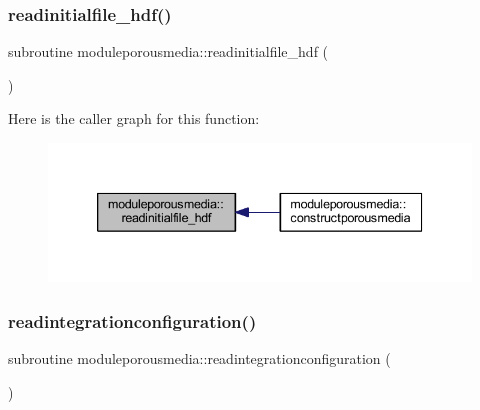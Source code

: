 \subsubsection{\texorpdfstring{readinitialfile\+\_\+hdf()}{readinitialfile\_hdf()}}
{\footnotesize\ttfamily subroutine moduleporousmedia\+::readinitialfile\+\_\+hdf (\begin{DoxyParamCaption}{ }\end{DoxyParamCaption})\hspace{0.3cm}{\ttfamily [private]}}

Here is the caller graph for this function\+:\nopagebreak
\begin{figure}[H]
\begin{center}
\leavevmode
\includegraphics[width=339pt]{namespacemoduleporousmedia_ad6fc7e9521189f7f68bcd991a1724a96_icgraph}
\end{center}
\end{figure}
\mbox{\label{namespacemoduleporousmedia_afd9c6f0efb919260c9cb27d5f27faf98}} 
\subsubsection{\texorpdfstring{readintegrationconfiguration()}{readintegrationconfiguration()}}
{\footnotesize\ttfamily subroutine moduleporousmedia\+::readintegrationconfiguration (\begin{DoxyParamCaption}{ }\end{DoxyParamCaption})\hspace{0.3cm}{\ttfamily [private]}}

